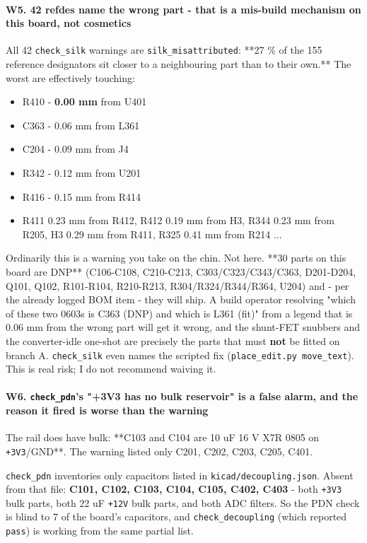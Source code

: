 \documentclass[11pt,a4paper]{article}
\begin{document}
\paragraph*{W5. 42 refdes name the wrong part - that is a mis-build mechanism on this board, not cosmetics}
All 42 \texttt{check\_silk} warnings are \texttt{silk\_misattributed}: {*}{*}27 \% of the 155 reference designators sit closer to a neighbouring part than to their own.{*}{*} The worst are effectively touching:

\begin{itemize}
\item R410 - \textbf{0.00 mm} from U401
\item C363 - 0.06 mm from L361
\item C204 - 0.09 mm from J4
\item R342 - 0.12 mm from U201
\item R416 - 0.15 mm from R414
\item R411 0.23 mm from R412, R412 0.19 mm from H3, R344 0.23 mm from R205, H3 0.29 mm from R411, R325 0.41 mm from R214 ...
\end{itemize}
Ordinarily this is a warning you take on the chin. Not here. {*}{*}30 parts on this board are DNP{*}{*} (C106-C108, C210-C213, C303/C323/C343/C363, D201-D204, Q101, Q102, R101-R104, R210-R213, R304/R324/R344/R364, U204) and - per the already logged BOM item - they will ship. A build operator resolving "which of these two 0603s is C363 (DNP) and which is L361 (fit)" from a legend that is 0.06 mm from the wrong part will get it wrong, and the shunt-FET snubbers and the converter-idle one-shot are precisely the parts that must \textbf{not} be fitted on branch A. \texttt{check\_silk} even names the scripted fix (\texttt{place\_edit.py move\_text}). This is real risk; I do not recommend waiving it.

\paragraph*{W6. \texttt{check\_pdn}'s "+3V3 has no bulk reservoir" is a false alarm, and the reason it fired is worse than the warning}
The rail does have bulk: {*}{*}C103 and C104 are 10 uF 16 V X7R 0805 on \texttt{+3V3}/GND{*}{*}. The warning listed only C201, C202, C203, C205, C401.

\texttt{check\_pdn} inventories only capacitors listed in \texttt{kicad/decoupling.json}. Absent from that file: \textbf{C101, C102, C103, C104, C105, C402, C403} - both \texttt{+3V3} bulk parts, both 22 uF \texttt{+12V} bulk parts, and both ADC filters. So the PDN check is blind to 7 of the board's capacitors, and \texttt{check\_decoupling} (which reported \texttt{pass}) is working from the same partial list.
\end{document}
